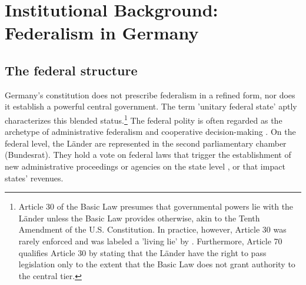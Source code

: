 \documentclass[12pt, abstract=true]{scrartcl}
\begin{document}
%
%

\section[Federalism in Germany]{Institutional Background: Federalism in Germany}\label{FederalisminGermany}
%
\subsection[The federal structure]{The federal structure}\label{FederalStructure}
Germany's constitution does not prescribe federalism in a refined form, nor does it establish a powerful central government. The term 'unitary federal state' \citep{Hesse1962, Turner2013} aptly characterizes this blended status.\footnote{
	Article 30 of the Basic Law presumes that governmental powers lie with the Länder unless the Basic Law provides otherwise, akin to the Tenth Amendment of the U.S. Constitution. In practice, however, Article 30 was rarely enforced and was labeled a 'living lie' by \cite{Scharpf1994}. Furthermore, Article 70 qualifies Article 30 by stating that the Länder have the right to pass legislation only to the extent that the Basic Law does not grant authority to the central tier.
} The federal polity is often regarded as the archetype of administrative federalism and cooperative decision-making \citep{Kropp2016}. On the federal level, the Länder are represented in the second parliamentary chamber (Bundesrat). They hold a vote on federal laws that trigger the establishment of new administrative proceedings or agencies on the state level \citep{Burkhart2008}, or that impact states' revenues. 
\end{document}
